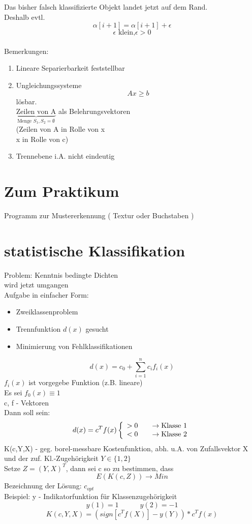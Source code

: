 \documentclass[a4paper,12pt]{scrreprt}
\begin{document}
Das bisher falsch klassifizierte Objekt landet jetzt auf dem Rand.\\
Deshalb evtl.
$$\alpha[i+1] = \alpha[i+1]+\epsilon$$
$$\epsilon \text{ klein,}\epsilon>0$$
\\
Bemerkungen:
\begin{enumerate}
 \item Lineare Separierbarkeit feststellbar
 \item Ungleichungssysteme
 $$A x \geq b $$
 lösbar.\\
 $\underbrace{\text{Zeilen von A}}_{\text{Menge }S_1, S_2=\emptyset}$ als Belehrungsvektoren\\
 (Zeilen von A in Rolle von x\\
 x in Rolle von c)
 \item Trennebene i.A. nicht eindeutig
\end{enumerate}

\section*{Zum Praktikum}

Programm zur Mustererkennung ( Textur oder Buchstaben ) 

\section{statistische Klassifikation}

Problem: Kenntnis bedingte Dichten\\
wird jetzt umgangen\\
Aufgabe in einfacher Form:
\begin{itemize}
 \item Zweiklassenproblem
 \item Trennfunktion $d(x)$ gesucht
 \item Minimierung von Fehlklassifikationen
\end{itemize}

$$d(x) = c_0 + \sum^n_{i=1}c_if_i(x) $$
$f_i(x)$ ist vorgegebe Funktion (z.B. lineare)\\
Es sei $f_0(x) \equiv 1$\\
c, f - Vektoren\\
Dann soll sein:
$$d(x) = c^Tf(x) \left\{ 
  \begin{array}{l l}
    > 0 & \quad \rightarrow \text{Klasse 1}\\
    < 0 & \quad \rightarrow \text{Klasse 2}
  \end{array} \right. $$
  K(c,Y,X) - geg. borel-messbare Kostenfunktion, abh. u.A. von Zufallsvektor X und der zuf. Kl.-Zugehörigkeit $Y\in\{1,2\}$\\
  Setze $Z=(Y,X)^T$, dann sei c so zu bestimmen, dass
  $$E(K(c,Z))\rightarrow Min$$
  Bezeichnung der Lösung: $c_{opt}$\\
  Beispiel: y - Indikatorfunktion für Klassenzugehörigkeit\\
  $$y(1) = 1\quad\quad\quad y(2)=-1$$
  $$K(c,Y,X) = (sign[c^Tf(X)] - y(Y)) * c^Tf(x)$$
  
\end{document}
